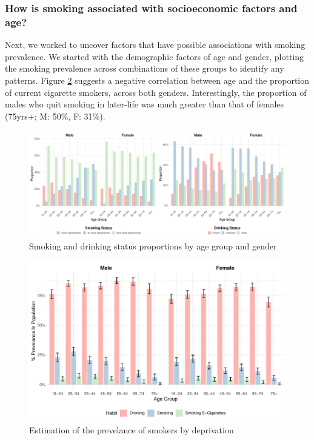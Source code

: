 \documentclass[
  11pt,
  twocolumn]{article}
\begin{document}
\hypertarget{how-is-smoking-associated-with-socioeconomic-factors-and-age}{%
\subsubsection{How is smoking associated with socioeconomic factors and
age?}\label{how-is-smoking-associated-with-socioeconomic-factors-and-age}}

Next, we worked to uncover factors that have possible associations with
smoking prevalence. We started with the demographic factors of age and
gender, plotting the smoking prevalence across combinations of these
groups to identify any patterns. Figure \ref{fig:output-prevelance-plot}
suggests a negative correlation between age and the proportion of
current cigarette smokers, across both genders. Interestingly, the
proportion of males who quit smoking in later-life was much greater than
that of females (75yrs+; M: 50\%, F: 31\%).

\begin{figure}[H]
\includegraphics{Coursework_files/figure-latex/output-smoking-drinking-age-plot-1} \caption{Smoking and drinking status proportions by age group and gender}\label{fig:output-smoking-drinking-age-plot}
\end{figure}

\begin{figure}[H]
\includegraphics{Coursework_files/figure-latex/output-prevelance-plot-1} \caption{Estimation of the prevelance of smokers by deprivation}\label{fig:output-prevelance-plot}
\end{figure}
\end{document}
